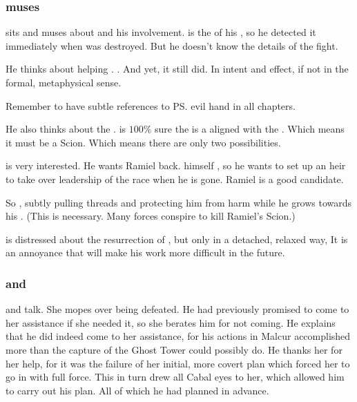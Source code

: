 \begin{garbage}
\subsubsection{\Azraid{} muses}
\Azraid{} sits and muses about \Ishnaruchaefir{} and his involvement. 
\Azraid{} is the \apex{} of his \matrix, so he detected it immediately when \Teshrial{} was destroyed. 
But he doesn't know the details of the fight. 

He thinks about \Ishnaruchaefir{} helping \Secherdamon. 
. 
And yet, it still did. 
In intent and effect, if not in the formal, metaphysical sense. 

Remember to have subtle references to \ps{\Azraid} evil hand in all \Azraid{} chapters. 

\begin{prose}
\end{prose}

He also thinks about the \vertexspike{}. 
\Achsah{} is $100\%$ sure the \vertex{} is a \sathariah{} aligned with the . 
Which means it must be a Scion. 
Which means there are only two possibilities. 

\Azraid{} is very interested. 
He wants Ramiel back. 
\Azraid{} himself , so he wants to set up an heir to take over leadership of the \resphan{} race when he is gone. 
Ramiel is a good candidate. 

So \Azraid{} , subtly pulling threads and protecting him from harm while he grows towards his \apotheosis. 
(This is necessary. Many forces conspire to kill Ramiel's Scion.)

\Azraid{} is distressed about the resurrection of \Nithdornazsh, but only in a detached, relaxed way, 
It is an annoyance that will make his work more difficult in the future. 






\subsubsection{\Secherdamon{} and \Nzessuacrith}
\Secherdamon{} and \Nzessuacrith{} talk. 
She mopes over being defeated. 
He had previously promised to come to her assistance if she needed it, so she berates him for not coming. 
He explains that he did indeed come to her assistance, for his actions in Malcur accomplished more than the capture of the Ghost Tower could possibly do. 
He thanks her for her help, for it was the failure of her initial, more covert plan which forced her to go in with full force. 
This in turn drew all Cabal eyes to her, which allowed him to carry out his plan. 
All of which he had planned in advance. 


\end{garbage}
